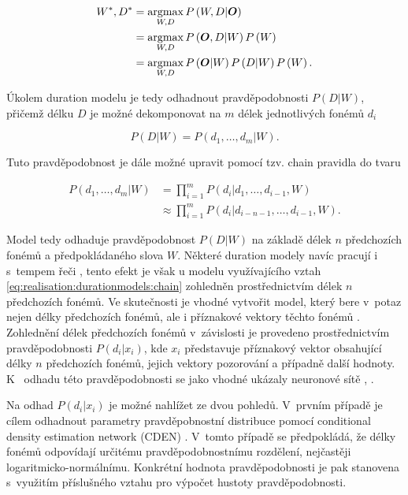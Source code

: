\begin{align}
  W^{*}, D^{*} &= \operatorname*{argmax}_{W, D} P\left(W, D| \boldsymbol{O}\right) \nonumber  \\
          &= \operatorname*{argmax}_{W, D} P\left(\boldsymbol{O}, D| W\right)P\left(W\right) \nonumber  \\
          &= \operatorname*{argmax}_{W, D} P\left(\boldsymbol{O}|W\right)P\left(D|W\right)P\left(W\right).
  \label{eq:realisation:durationmodels:assumtion}
\end{align}

\noindent Úkolem duration modelu je tedy odhadnout pravděpodobnosti $P\left(D|W\right)$, přičemž délku $D$ je možné dekomponovat na $m$ délek jednotlivých fonémů $d_{i}$

\begin{equation}
  P\left(D | W\right) = P\left(d_{1}, \dots, d_{m}|W\right).
  \label{eq:realisation:durationmodels:decomposition}
\end{equation}

\noindent Tuto pravděpodobnost je dále možné upravit pomocí tzv. chain pravidla do tvaru

\begin{align}
  P\left(d_{1}, \dots, d_{m} | W\right) &= \prod_{i=1}^{m} P\left(d_{i} | d_{1}, \dots, d_{i-1}, W\right) \nonumber \\
        &\approx \prod_{i=1}^{m} P\left(d_{i} | d_{i-n-1}, \dots, d_{i-1}, W\right).
  \label{eq:realisation:durationmodels:chain}
\end{align}

\noindent Model tedy odhaduje pravděpodobnost $P\left(D|W\right)$ na základě délek $n$ předchozích fonémů a předpokládaného slova $W$. Některé duration modely navíc pracují i s~tempem řeči \cite{Pylkkonen2004}, tento efekt je však u modelu využívajícího vztah \ref{eq:realisation:durationmodels:chain} zohledněn prostřednictvím délek $n$ předchozích fonémů. Ve skutečnosti je vhodné vytvořit model, který bere v~potaz nejen délky předchozích fonémů, ale i příznakové vektory těchto fonémů \cite{Alumae2014}. Zohlednění délek předchozích fonémů v~závislosti je provedeno prostřednictvím pravděpodobnosti  $P\left(d_{i}|x_{i}\right)$, kde $x_{i}$ představuje příznakový vektor obsahující délky $n$ předchozích fonémů, jejich vektory pozorování a případně další hodnoty. K~ odhadu této pravděpodobnosti se jako vhodné ukázaly neuronové sítě \cite{Alumae2014}, \cite{Hadian2017}.

Na odhad $P\left(d_{i}|x_{i}\right)$ je možné nahlížet ze dvou pohledů. V~prvním případě je cílem odhadnout parametry pravděpobnostní distribuce pomocí conditional density estimation network (CDEN) \cite{Alumae2014}. V~tomto případě se předpokládá, že délky fonémů odpovídají určitému pravděpodobnostnímu rozdělení, nejčastěji logaritmicko-normálnímu. Konkrétní hodnota pravděpodobnosti je pak stanovena s~využitím příslušného vztahu pro výpočet hustoty pravděpodobnosti.

